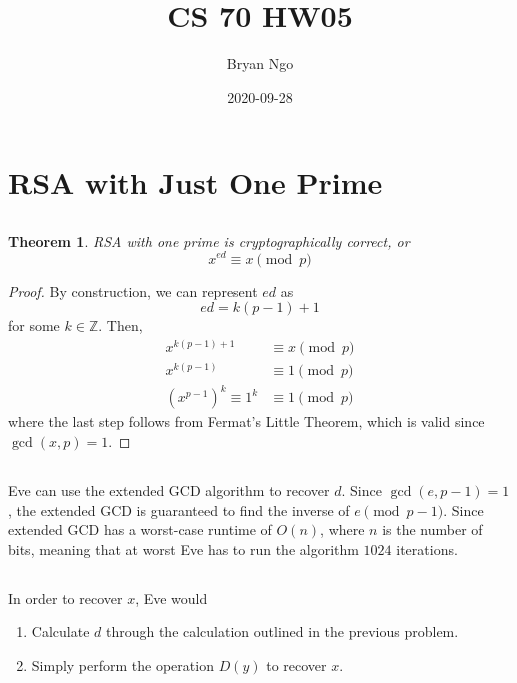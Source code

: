\documentclass{article}
\title{CS 70 HW05}
\author{Bryan Ngo}
\date{2020-09-28}
\newtheorem{theorem}{Theorem}
\newcommand{\Z}{\mathbb{Z}}
\begin{document}
\maketitle

\section{RSA with Just One Prime}

\subsection{}

\begin{theorem}
    RSA with one prime is cryptographically correct, or
    \begin{equation}
        x^{ed} \equiv x \pmod{p}
    \end{equation}
\end{theorem}
\begin{proof}
    By construction, we can represent \(ed\) as
    \begin{equation}
        ed = k(p - 1) + 1
    \end{equation}
    for some \(k \in \Z\).
    Then,
    \begin{align}
        x^{k(p - 1) + 1} &\equiv x \pmod{p} \\
        x^{k(p - 1)} &\equiv 1 \pmod{p} \\
        (x^{p - 1})^k \equiv 1^k &\equiv 1 \pmod{p}
    \end{align}
    where the last step follows from Fermat's Little Theorem, which is valid since \(\gcd(x, p) = 1\).
\end{proof}

\subsection{}

Eve can use the extended GCD algorithm to recover \(d\).
Since \(\gcd(e, p - 1) = 1\), the extended GCD is guaranteed to find the inverse of \(e \pmod{p - 1}\).
Since extended GCD has a worst-case runtime of \(O(n)\), where \(n\) is the number of bits, meaning that at worst Eve has to run the algorithm \(1024\) iterations.

\subsection{}

In order to recover \(x\), Eve would
\begin{enumerate}
    \item Calculate \(d\) through the calculation outlined in the previous problem.
    \item Simply perform the operation \(D(y)\) to recover \(x\).
\end{enumerate}
\end{document}
